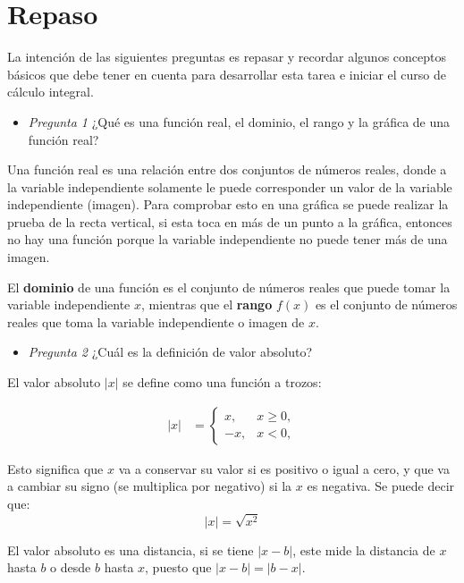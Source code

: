 \section{Repaso}

La intención de las siguientes preguntas es repasar y recordar algunos conceptos básicos que debe tener en cuenta para desarrollar esta tarea e iniciar el curso de cálculo integral.

\begin{itemize}
    \item \textit{Pregunta 1} ¿Qué es una función real, el dominio, el rango y la gráfica de una función real?
\end{itemize}

Una función real es una relación entre dos conjuntos de números reales, donde a la variable independiente solamente le puede corresponder un valor de la variable independiente (imagen). Para comprobar esto en una gráfica se puede realizar la prueba de la recta vertical, si esta toca en más de un punto a la gráfica, entonces no hay una función porque la variable independiente no puede tener más de una imagen.

El \textbf{dominio} de una función es el conjunto de números reales que puede tomar la variable independiente $x$, mientras que el \textbf{rango} $f(x)$ es el conjunto de números reales que toma la variable independiente o imagen de $x$.

\begin{itemize}
    \item \textit{Pregunta 2} ¿Cuál es la definición de valor absoluto?
\end{itemize}

El valor absoluto $|x|$ se define como una función a trozos:

\begin{align*}
    |x| &=
    \begin{cases}
        x, & x \geq 0, \\
        -x, & x < 0,
    \end{cases}
\end{align*}

Esto significa que $x$ va a conservar su valor si es positivo o igual a cero, y que va a cambiar su signo (se multiplica por negativo) si la $x$ es negativa. Se puede decir que:
\[
|x| = \sqrt{x^2}
\]

El valor absoluto es una distancia, si se tiene $|x - b|$, este mide la distancia de $x$ hasta $b$ o desde $b$ hasta $x$, puesto que $|x - b| = |b - x|$.

